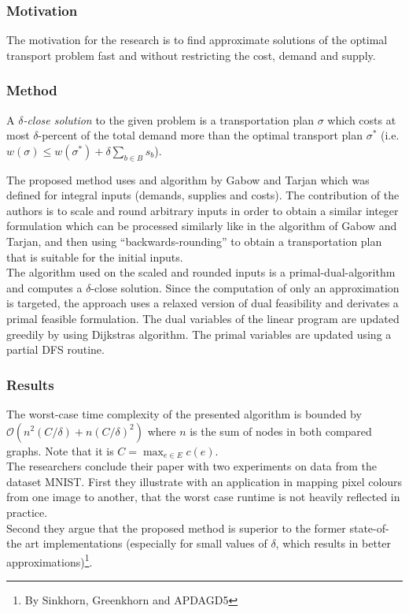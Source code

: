 \documentclass[twoside,twocolumn]{scrartcl}
\begin{document}
\subsubsection{Motivation}
The motivation for the research is to find approximate solutions of the optimal transport problem fast and without restricting the cost, demand and supply.
\subsubsection{Method}
A $\delta$\textit{-close solution} to the given problem is a transportation plan $\sigma$ which costs at most $\delta$-percent of the total demand more than the optimal transport plan $\sigma^*$ (i.e. $w(\sigma) \le w(\sigma^*) + \delta \sum_{b\in B} s_b$). %

The proposed method uses and algorithm by Gabow and Tarjan which was defined for integral inputs (demands, supplies and costs). The contribution of the authors is to scale and round arbitrary inputs in order to obtain a similar integer formulation which can be processed similarly like in the algorithm of Gabow and Tarjan, and then using \enquote{backwards-rounding} to obtain a transportation plan that is suitable for the initial inputs.\\
The algorithm used on the scaled and rounded inputs is a primal-dual-algorithm and computes a $\delta$-close solution. Since the computation of only an approximation is targeted, the approach uses a relaxed version of dual feasibility and derivates a primal feasible formulation. The dual variables of the linear program are updated greedily by using Dijkstras algorithm. The primal variables are updated using a partial DFS routine.

\subsubsection{Results}
The worst-case time complexity of the presented algorithm is bounded by $\mathcal{O}(n^2(C/\delta) + n(C/\delta)^2)$ where $n$ is the sum of nodes in both compared graphs. Note that it is $C= \max_{e\in E} c(e)$.\\

The researchers conclude their paper with two experiments on data from the dataset MNIST. First they illustrate with an application in mapping pixel colours from one image to another, that the worst case runtime is not heavily reflected in practice.\\
Second they argue that the proposed method is superior to the former state-of-the art implementations (especially for small values of $\delta$, which results in better approximations)\footnote{By Sinkhorn, Greenkhorn and APDAGD5}.\\ 
\end{document}
